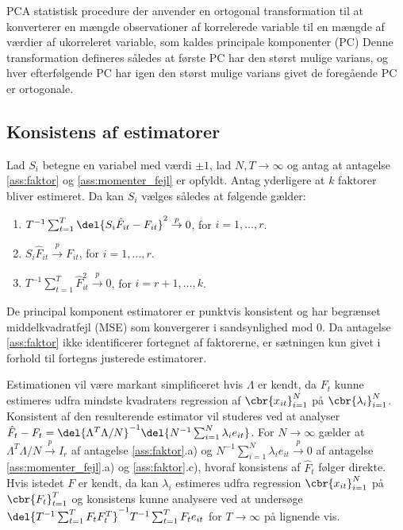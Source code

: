 PCA
statistisk procedure der anvender en ortogonal transformation til at konverterer en mængde observationer af korrelerede variable til en mængde af værdier af ukorreleret variable, som kaldes principale komponenter (PC)
Denne transformation defineres således at første PC har den størst mulige varians, og hver efterfølgende PC har igen den størst mulige varians givet de foregående PC er ortogonale.

\subsection{Konsistens af estimatorer}

\begin{thm} \label{thm:factorthm1}
Lad \(S_i\) betegne en variabel med værdi \(\pm 1\), lad \(N, T \rightarrow \infty\) og antag at antagelse \ref{ass:faktor} og \ref{ass:momenter_fejl} er opfyldt.
Antag yderligere at \(k\) faktorer bliver estimeret.
Da kan \(S_i\) vælges således at følgende gælder:
\begin{enumerate}
\item \(T^{-1} \sum_{t=1}^T \del{S_i \hat{F}_{it} - F_{it}}^2 \overset{p}{\rightarrow} 0\), for \(i=1, \ldots, r\).
\item \(S_i \hat{F}_{it} \overset{p}{\rightarrow} F_{it}\), for \(i=1, \ldots, r\).
\item \(T^{-1} \sum_{t=1}^T \hat{F}_{it}^2 \overset{p}{\rightarrow} 0\), for \(i=r+1, \ldots, k\).
\end{enumerate}
\end{thm}


De principal komponent estimatorer er punktvis konsistent og har begrænset middelkvadratfejl (MSE) som konvergerer i sandsynlighed mod 0.
Da antagelse \ref{ass:faktor} ikke identificerer fortegnet af faktorerne, er sætningen kun givet i forhold til fortegns justerede estimatorer.



Estimationen vil være markant simplificeret hvis \(\Lambda\)  er kendt, da \(F_t\)  kunne estimeres udfra mindste kvadraters regression af \(\cbr{x_{it}}_{i=1}^N\) på \(\cbr{\lambda_i}_{i=1}^N\).
Konsistent af den resulterende estimator vil studeres ved at analyser \(\hat{F}_t - F_t = \del{\Lambda^T \Lambda / N}^{-1} \del{N^{-1} \sum_{i=1}^N \lambda_i e_{it}}\).
For \(N \rightarrow \infty\) gælder at \(\Lambda^T \Lambda / N \overset{p}{\rightarrow} I_r\) af antagelse \ref{ass:faktor}.a) og \(N^{-1} \sum_{i=1}^N \lambda_i e_{it} \overset{p}{\rightarrow} 0\) af antagelse \ref{ass:momenter_fejl}.a) og \ref{ass:faktor}.c), hvoraf konsistens af \(\hat{F}_t\) følger direkte.
Hvis istedet \(F\) er kendt, da kan \(\lambda_i\) estimeres udfra regression \(\cbr{x_{it}}_{i=1}^N\) på \(\cbr{F_{t}}_{t=1}^T\) og konsistens kunne analysere ved at undersøge \(\del{T^{-1} \sum_{t=1}^T F_t F_t^T}^{-1} T^{-1} \sum_{t=1}^T F_t e_{it}\) for \(T \rightarrow \infty\) på lignende vis.

